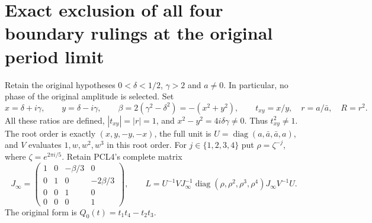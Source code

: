 \documentclass[11pt,a4paper]{article}
\begin{document}
\section{Exact exclusion of all four boundary rulings at the original period limit}
\label{sec:LBRE}
Retain the original hypotheses $0<\delta<1/2$, $\gamma>2$ and
$a\ne0$. In particular, no phase of the original amplitude is selected.
Set
\[
 x=\delta+i\gamma,\qquad y=\delta-i\gamma,\qquad
 \beta=2(\gamma^2-\delta^2)=-(x^2+y^2),\qquad
 t_{xy}=x/y,\quad r=a/\bar a,\quad R=r^2.
 \tag{LBRE1}
\]
All these ratios are defined, $|t_{xy}|=|r|=1$, and
$x^2-y^2=4i\delta\gamma\ne0$. Thus $t_{xy}^2\ne1$.
The root order is exactly $(x,y,-y,-x)$, the full unit is
$U=\operatorname{diag}(a,\bar a,\bar a,a)$, and $V$ evaluates
$1,w,w^2,w^3$ in this root order. For $j\in\{1,2,3,4\}$ put
$\rho=\zeta^{-j}$, where $\zeta=e^{2\pi i/5}$. Retain PCL4's
complete matrix
\[
 J_\infty=
 \begin{pmatrix}1&0&-\beta/3&0\\0&1&0&-2\beta/3\\
 0&0&1&0\\0&0&0&1\end{pmatrix},\qquad
 L=U^{-1}VJ_\infty^{-1}
 \operatorname{diag}(\rho,\rho^2,\rho^3,\rho^4)
 J_\infty V^{-1}U.
 \tag{LBRE2}
\]
The original form is $Q_0(t)=t_1t_4-t_2t_3$.
\end{document}
